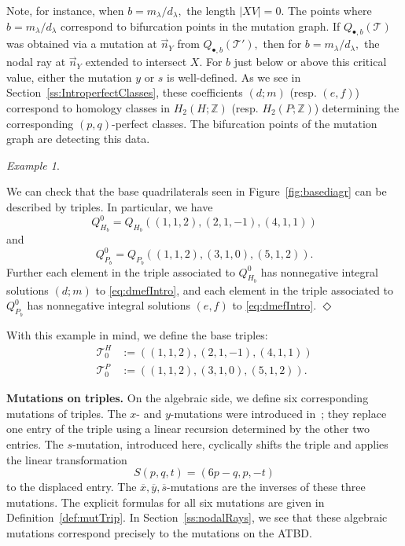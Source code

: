\documentclass[11pt, reqno]{amsart}
\theoremstyle{remark}
\numberwithin{equation}{subsection}
\numberwithin{figure}{section}
\theoremstyle{customremark}
\newtheorem{example_no_diamond}[thm]{Example}
\newenvironment{example}{\begin{example_no_diamond} } {\hfill$\er$ \end{example_no_diamond}}
\newcommand{\Tt}{\mathcal{T}}
\newcommand{\vn}{{\vec{n}}}
\newcommand{\ov}{\overline}
\newcommand{\la}{{\lambda}}
\newcommand{\er}{{\Diamond}}
\newcommand{\Z}{\mathbb{Z}}
\begin{document}
 Note, for instance, when $b=m_\la/d_\la,$ the length $|XV|=0.$ The points where $b=m_\la/d_\la$ correspond to bifurcation points in the mutation graph. If $Q_{\bullet,b}(\Tt)$ was obtained via a mutation at $\vn_Y$ from $Q_{\bullet,b}(\Tt'),$ then for $b=m_\la/d_\la,$ the nodal ray at $\vn_Y$ extended to intersect $X.$ For $b$ just below or above this critical value, either the mutation $y$ or $s$ is well-defined. As we see in Section~\ref{ss:IntroperfectClasses}, these coefficients $(d;m)$ (resp. $(e,f)$) correspond to homology classes in $H_2(H;\Z)$ (resp. $H_2(P;\Z)$) determining the corresponding $(p,q)$-perfect classes. The bifurcation points of the mutation graph are detecting this data. 


\begin{example} \label{ex:baseDiagrams}

    
    We can check that the base quadrilaterals seen in Figure~\ref{fig:basediagr} can be described by triples. In particular, we have
    \[Q_{H_b}^0=Q_{H_b}\left((1,1,2),(2,1,-1),(4,1,1)\right)\] 
    and 
     \[ Q_{P_b}^0=Q_{P_b}\left((1,1,2),(3,1,0),(5,1,2)\right).\]
     Further each element in the triple associated to $Q_{H_b}^0$ has nonnegative integral solutions $(d;m)$ to \eqref{eq:dmefIntro}, and each element in the triple associated to $Q_{P_b}^0$ has nonnegative integral solutions $(e,f)$ to \eqref{eq:dmefIntro}.
\end{example}

With this example in mind, we define the base triples:
\begin{align}
    \Tt_0^H&:=\left((1,1,2),(2,1,-1),(4,1,1)\right) \\
    \Tt_0^P&:=\left((1,1,2),(3,1,0),(5,1,2)\right).
\end{align}

\noindent\textbf{Mutations on triples.}
On the algebraic side, we define six corresponding mutations of triples. The \(x\)- and \(y\)-mutations were introduced in~\cite{MMW}; they replace one entry of the triple using a linear recursion determined by the other two entries. The \(s\)-mutation, introduced here, cyclically shifts the triple and applies the linear transformation
\[
        S(p,q,t)=(6p-q,p,-t)
\]
to the displaced entry. The $\ov{x},\ov{y},\ov{s}$-mutations are the inverses of these three mutations. The explicit formulas for all six mutations are given in Definition~\ref{def:mutTrip}. In Section~\ref{ss:nodalRays}, we see that these algebraic mutations correspond precisely to the mutations on the ATBD. 
\end{document}
